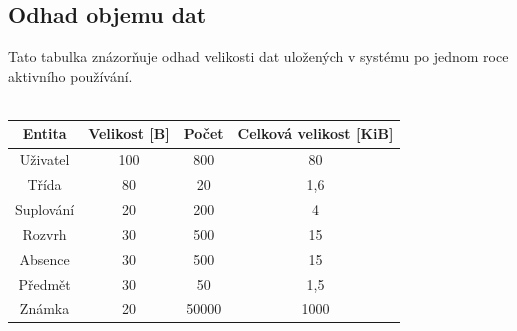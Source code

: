\documentclass[a4paper,10pt,titlepage]{article}
\begin{document}
	\subsection{Odhad objemu dat}
		Tato tabulka znázorňuje odhad velikosti dat uložených v systému po jednom roce aktivního používání.
		\\\\
		\begin{tabular}{| c | c | c | c |}
			\hline
			Entita & Velikost [B] & Počet & Celková velikost [KiB] \\ \hline
			Uživatel & 100 & 800 & 80 \\ \hline
			Třída & 80 & 20 & 1,6 \\ \hline
			Suplování & 20 & 200 & 4 \\ \hline
			Rozvrh & 30 & 500 & 15 \\ \hline
			Absence & 30 & 500 & 15 \\ \hline
			Předmět & 30 & 50 & 1,5 \\ \hline
			Známka & 20 & 50000 & 1000 \\
			\hline
		\end{tabular}
\end{document}
